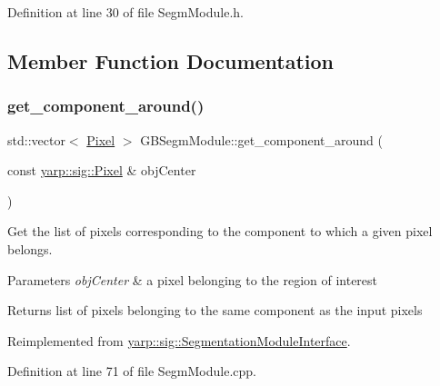 Definition at line 30 of file Segm\+Module.\+h.



\subsection{Member Function Documentation}
\mbox{\label{classGBSegmModule_a0b63c53513e67c4f126e29cf7f28ad53}} 
\subsubsection{\texorpdfstring{get\_component\_around()}{get\_component\_around()}}
{\footnotesize\ttfamily std\+::vector$<$ \mbox{\hyperlink{classyarp_1_1sig_1_1Pixel}{Pixel}} $>$ G\+B\+Segm\+Module\+::get\+\_\+component\+\_\+around (\begin{DoxyParamCaption}\item[{const \mbox{\hyperlink{classyarp_1_1sig_1_1Pixel}{yarp\+::sig\+::\+Pixel}} \&}]{obj\+Center }\end{DoxyParamCaption})\hspace{0.3cm}{\ttfamily [virtual]}}



Get the list of pixels corresponding to the component to which a given pixel belongs. 


\begin{DoxyParams}{Parameters}
{\em obj\+Center} & a pixel belonging to the region of interest \\
\hline
\end{DoxyParams}
\begin{DoxyReturn}{Returns}
list of pixels belonging to the same component as the input pixels 
\end{DoxyReturn}


Reimplemented from \mbox{\hyperlink{classyarp_1_1sig_1_1SegmentationModuleInterface_a9bf0b95fbab216b2284122b0b8a36820}{yarp\+::sig\+::\+Segmentation\+Module\+Interface}}.



Definition at line 71 of file Segm\+Module.\+cpp.



